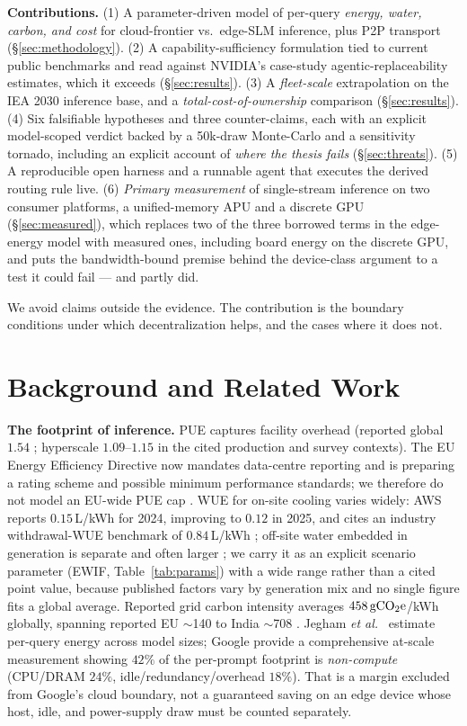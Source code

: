 \documentclass[conference]{IEEEtran}
\newcommand{\gco}{\,\text{gCO\textsubscript{2}e}}
\begin{document}
\textbf{Contributions.}
(1) A parameter-driven model of per-query \emph{energy, water,
carbon, and cost} for cloud-frontier vs.\ edge-SLM inference, plus P2P transport
(\S\ref{sec:methodology}).
(2) A capability-sufficiency formulation tied to current public benchmarks and
read against NVIDIA's case-study agentic-replaceability estimates, which it exceeds
(\S\ref{sec:results}).
(3) A \emph{fleet-scale} extrapolation on the IEA 2030 inference base, and a
\emph{total-cost-of-ownership} comparison (\S\ref{sec:results}).
(4) Six falsifiable hypotheses and three counter-claims, each with an explicit
model-scoped verdict backed by a 50k-draw Monte-Carlo and a sensitivity tornado, including an
explicit account of \emph{where the thesis fails} (\S\ref{sec:threats}).
(5) A reproducible open harness and a runnable agent that executes the derived
routing rule live.
(6) \emph{Primary measurement} of single-stream inference on two consumer
platforms, a unified-memory APU and a discrete GPU (\S\ref{sec:measured}),
which replaces two of the three borrowed terms in the edge-energy model with
measured ones, including board energy on the discrete GPU, and puts the
bandwidth-bound premise behind the device-class argument to a test it could
fail --- and partly did.

We avoid claims outside the evidence. The contribution is the boundary conditions
under which decentralization helps, and the cases where it does not.

\section{Background and Related Work}
\textbf{The footprint of inference.}
PUE captures facility overhead (reported global $1.54$ \cite{uptime2025};
hyperscale $1.09$--$1.15$ in the cited production and survey contexts). The EU
Energy Efficiency Directive now mandates data-centre
reporting and is preparing a rating scheme and possible minimum performance
standards; we therefore do not model an EU-wide PUE cap \cite{eu_eed2026}. WUE
for on-site cooling varies widely: AWS reports $0.15$\,L/kWh for 2024, improving
to $0.12$ in 2025, and cites
an industry withdrawal-WUE benchmark of $0.84$\,L/kWh
\cite{aws_water2025,devriesgao2025}; off-site water embedded in generation is
separate and often larger \cite{ucriverside2023}; we carry it as an explicit
scenario parameter (EWIF, Table~\ref{tab:params}) with a wide range rather than a
cited point value, because published factors vary by generation mix and no
single figure fits a global average. Reported grid carbon intensity averages
$458\gco$/kWh
globally, spanning reported EU $\sim$140 to India $\sim$708 \cite{ember2026}. Jegham
\emph{et al.}\ \cite{jegham2025} estimate per-query energy across model sizes;
Google \cite{elsworth2025} provide a comprehensive at-scale measurement showing
$42\%$ of the per-prompt footprint is \emph{non-compute} (CPU/DRAM $24\%$,
idle/redundancy/overhead $18\%$). That is a margin excluded from Google's
cloud boundary, not a guaranteed saving on an edge device whose host, idle,
and power-supply draw must be counted separately.
\end{document}
